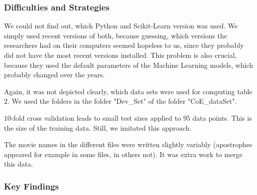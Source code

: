 \subsubsection*{Difficulties and Strategies}
We could not find out, which Python and Scikit-Learn version was used. We simply used recent versions of both, because guessing, which versions the researchers had on their computers seemed hopeless to us, since they probably did not have the most recent versions installed. This problem is also crucial, because they used the default parameters of the Machine Learning models, which probably changed over the years. 

Again, it was not depicted clearly, which data sets were used for computing table $2$. We used the folders in the folder "Dev_Set" of the folder "CoE_dataSet". 

$10$-fold cross validation leads to small test sizes applied to $95$ data points. This is the size of the training data. Still, we imitated this approach. 

The movie names in the different files were written slightly variably (apostrophes appeared for example in some files, in others not). It was extra work to merge this data. 



\subsubsection*{Key Findings}
